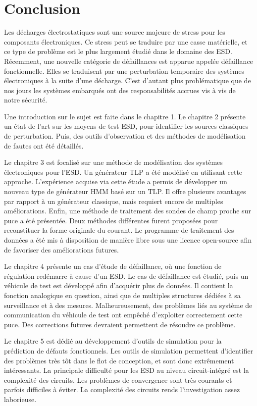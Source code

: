 \chapter{Conclusion}

Les décharges électrostatiques sont une source majeure de stress pour les composants électroniques.
Ce stress peut se traduire par une casse matérielle, et ce type de problème est le plus largement étudié dans le domaine des ESD.
Récemment, une nouvelle catégorie de défaillances est apparue appelée défaillance fonctionnelle.
Elles se traduisent par une perturbation temporaire des systèmes électroniques à la suite d'une décharge.
C'est d'autant plus problématique que de nos jours les systèmes embarqués ont des responsabilités accrues vis à vis de notre sécurité.

Une introduction sur le sujet est faite dans le chapitre 1.
Le chapitre 2 présente un état de l'art sur les moyens de test ESD, pour identifier les sources classiques de perturbation.
Puis, des outils d'observation et des méthodes de modélisation de fautes ont été détaillés.

Le chapitre 3 est focalisé sur une méthode de modélisation des systèmes électroniques pour l'ESD.
Un générateur TLP a été modélisé en utilisant cette approche.
L'expérience acquise via cette étude a permis de développer un nouveau type de générateur HMM basé sur un TLP.
Il offre plusieurs avantages par rapport à un générateur classique, mais requiert encore de multiples améliorations.
Enfin, une méthode de traitement des sondes de champ proche sur puce a été présentée.
Deux méthodes différentes furent proposées pour reconstituer la forme originale du courant.
Le programme de traitement des données a été mis à disposition de manière libre \cite{nfs-repository} sous une licence open-source afin de favoriser des améliorations futures.

Le chapitre 4 présente un cas d'étude de défaillance, où une fonction de régulation redémarre à cause d'un ESD.
Le cas de défaillance est étudié, puis un véhicule de test est développé afin d'acquérir plus de données.
Il contient la fonction analogique en question, ainsi que de multiples structures dédiées à sa surveillance et à des mesures.
Malheureusement, des problèmes liés au système de communication du véhicule de test ont empêché d'exploiter correctement cette puce.
Des corrections futures devraient permettent de résoudre ce problème.

Le chapitre 5 est dédié au développement d'outils de simulation pour la prédiction de défauts fonctionnels.
Les outils de simulation permettent d'identifier des problèmes très tôt dans le flot de conception, et sont donc extrêmement intéressants.
La principale difficulté pour les ESD au niveau circuit-intégré est la complexité des circuits.
Les problèmes de convergence sont très courants et parfois difficiles à éviter.
La complexité des circuits rends l'investigation assez laborieuse.

